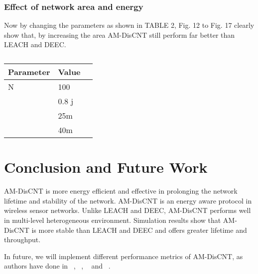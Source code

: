 \documentclass[journal]{IEEEtran}
\begin{document}
\subsubsection{Effect of network area and energy}
Now by changing the parameters as shown in TABLE 2, Fig. 12 to Fig. 17 clearly show that, by increasing the area AM-DisCNT still perform far better than LEACH and DEEC.

 \begin{table}[htbp]
  \centering
  \caption{}
  \begin{tabular}[height=9cm,width=9cm]{lll}
    \toprule
    Parameter & Value  &  \\
    \midrule

   N            & 100  \\
            & 0.8 j \\
             & 25m \\
            & 40m \\

     \bottomrule
 \end{tabular}\label{tab:addlabe2}\end{table}


\section{Conclusion and Future Work}
 AM-DisCNT is more energy efficient and effective in prolonging the network lifetime and stability of the network. AM-DisCNT is an energy aware protocol in wireless sensor networks. Unlike LEACH and DEEC, AM-DisCNT performs well in multi-level heterogeneous environment. Simulation results show that AM-DisCNT is more stable than LEACH and DEEC and offers greater lifetime and throughput.

 In future, we will implement different performance metrics of AM-DisCNT, as authors have done in ~\cite{17}, ~\cite{18}, ~\cite{19} and ~\cite{20}.

 \ifCLASSOPTIONcaptionsoff
  \newpage
\fi
\end{document}

